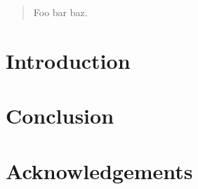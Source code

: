 \documentclass{scrartcl}
\begin{document}
\begin{abstract}
Foo bar baz.
\end{abstract}

\section{Introduction} \label{sec:introduction}

\section{Conclusion} \label{sec:conclusion}

\section{Acknowledgements} \label{sec:acknowledgements}


\end{document}
